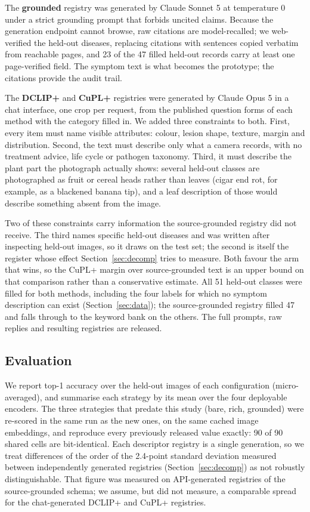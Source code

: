 \documentclass[a4paper,fleqn]{cas-dc}
\begin{document}
The \textbf{grounded} registry was generated by Claude Sonnet 5 at temperature 0 under a strict
grounding prompt that forbids uncited claims. Because the generation endpoint cannot browse, raw
citations are model-recalled; we web-verified the held-out diseases, replacing citations with
sentences copied verbatim from reachable pages, and 23 of the 47 filled held-out records carry at
least one page-verified field. The symptom text is what becomes the prototype; the citations provide
the audit trail.

The \textbf{DCLIP+} and \textbf{CuPL+} registries were generated by Claude Opus 5 in a chat
interface, one crop per request, from the published question forms of each method with the category
filled in. We added three constraints to both. First, every item must name visible attributes:
colour, lesion shape, texture, margin and distribution. Second, the text must describe only what a
camera records, with no treatment advice, life cycle or pathogen taxonomy. Third, it must describe
the plant part the photograph actually shows: several held-out classes are photographed as fruit or
cereal heads rather than leaves (cigar end rot, for example, as a blackened banana tip), and a leaf
description of those would describe something absent from the image.

Two of these constraints carry information the source-grounded registry did not receive. The third
names specific held-out diseases and was written after inspecting held-out images, so it draws on
the test set; the second is itself the register whose effect Section~\ref{sec:decomp} tries to
measure. Both favour the arm that wins, so the CuPL+ margin over source-grounded text is an upper
bound on that comparison rather than a conservative estimate. All 51 held-out classes were filled
for both methods, including the four labels for which no symptom description can exist
(Section~\ref{sec:data}); the source-grounded registry filled 47 and falls through to the keyword
bank on the others. The full prompts, raw replies and resulting registries are released.

\subsection{Evaluation}
\label{sec:eval}

We report top-1 accuracy over the held-out images of each configuration (micro-averaged), and
summarise each strategy by its mean over the four deployable encoders. The three strategies that
predate this study (bare, rich, grounded) were re-scored in the same run as the new ones, on the
same cached image embeddings, and reproduce every previously released value exactly: 90 of 90
shared cells are bit-identical. Each descriptor registry is a single generation, so we treat
differences of the order of the 2.4-point standard deviation measured between independently
generated registries (Section~\ref{sec:decomp}) as not robustly distinguishable. That figure was
measured on API-generated registries of the source-grounded schema; we assume, but did not measure,
a comparable spread for the chat-generated DCLIP+ and CuPL+ registries.
\end{document}

